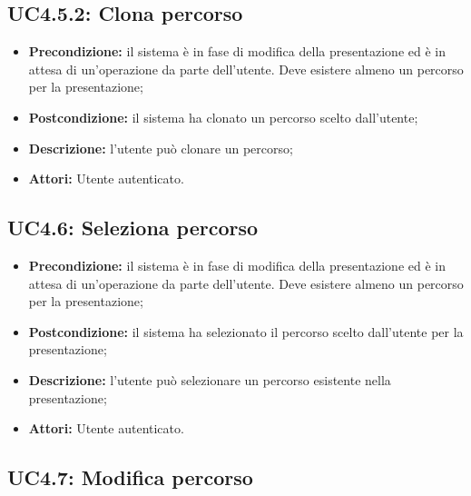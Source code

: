 \subsection{ UC4.5.2: Clona percorso}

\begin{itemize}
	\item \textbf{Precondizione:} il sistema è in fase di modifica della presentazione ed è in attesa di un'operazione da parte dell'utente. Deve esistere almeno un percorso per la presentazione;
	\item \textbf{Postcondizione:} il sistema ha clonato un percorso scelto dall'utente;
	\item \textbf{Descrizione:} l'utente può clonare un percorso;
	\item \textbf{Attori:} Utente autenticato.
\end{itemize}
\subsection{ UC4.6: Seleziona percorso}

\begin{itemize}
	\item \textbf{Precondizione:} il sistema è in fase di modifica della presentazione ed è in attesa di un'operazione da parte dell'utente. Deve esistere almeno un percorso per la presentazione;
	\item \textbf{Postcondizione:} il sistema ha selezionato il percorso scelto dall'utente per la presentazione;
	\item \textbf{Descrizione:} l'utente può selezionare un percorso esistente nella presentazione;
	\item \textbf{Attori:} Utente autenticato.
\end{itemize}
\subsection{ UC4.7: Modifica percorso}

